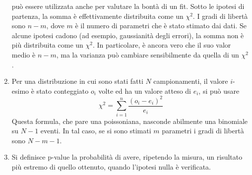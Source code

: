 \documentclass[a4paper,11pt]{article}
\begin{document}
\begin{enumerate}[resume]
	può essere utilizzata anche per valutare la bontà di un fit. Sotto le ipotesi di partenza, la somma è effettivamente distribuita come un $\chi^2$. I gradi di libertà sono $n-m$, dove $m$ è il numero di parametri che è stato stimato dai dati. Se alcune ipotesi cadono (ad esempio, gaussianità degli errori), la somma non è più distribuita come un $\chi^2$. In particolare, è ancora vero che il suo valor medio è $n-m$, ma la varianza può cambiare sensibilmente da quella di un $\chi^2$.
	\item Per una distribuzione in cui sono stati fatti $N$ campionamenti, il valore $i$-esimo è stato conteggiato $o_i$ volte ed ha un valore atteso di $e_i$, si può usare
	\[\chi^2=\sum_{i=1}^{n}\frac{(o_i-e_i)^2}{e_i}\]
	Questa formula, che pare una poissoniana, nasconde abilmente una binomiale su $N-1$ eventi. In tal caso, se si sono stimati $m$ parametri i gradi di libertà sono $N-m-1$.
	\item Si definisce p-value la probabilità di avere, ripetendo la misura, un risultato più estremo di quello ottenuto, quando l'ipotesi nulla è verificata.
\end{enumerate}
\end{document}
